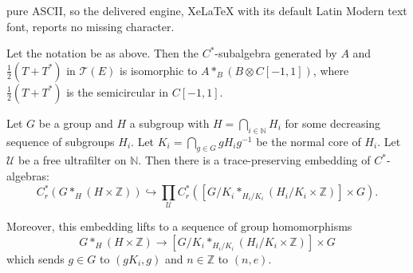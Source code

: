 \documentclass[10pt,a4paper]{amsart}
\newcommand{\N}{\ensuremath{\mathbb{N}}}
\newcommand{\Z}{\ensuremath{\mathbb{Z}}}
\newcommand{\cT}{\ensuremath{\mathcal{T}}}
\newcommand{\cU}{\ensuremath{\mathcal{U}}}
\begin{document}
pure ASCII, so the delivered engine, XeLaTeX with its default Latin Modern text font, reports no missing character.
\begin{thm}\label{isomorphism thm}
    Let the notation be as above. Then the $C^*$-subalgebra generated by $A$ and $\frac{1}{2}(T+T^*)$ in $\cT(E)$ is isomorphic to $A\ast_{B} (B\otimes C[-1,1])$, where $\frac{1}{2}(T+T^*)$ is the semicircular in $C[-1,1]$.
\end{thm}

\begin{lem}\label{lem:2.3}
    Let $G$ be a group and $H$ a subgroup with $H=\bigcap_{i\in \N} H_i$ for some decreasing sequence of subgroups $H_i$. Let $K_i = \bigcap_{g \in G} gH_ig^{-1}$ be the normal core of $H_i$. Let $\cU$ be a free ultrafilter on $\N$. Then there is a trace-preserving embedding of $C^*$-algebras:
    \[C_r^*(G\ast_H (H\times\Z)) \hookrightarrow \prod_\cU C_r^*([G/K_i\ast_{H_i/K_i} (H_i/K_i\times\Z)] \times G).\]

    Moreover, this embedding lifts to a sequence of group homomorphisms
    \[G \ast_H (H \times \Z) \to [G/K_i\ast_{H_i/K_i} (H_i/K_i\times\Z)] \times G\] which sends $g\in G$ to $(gK_i, g)$ and $n\in \Z$ to $(n,e)$. 

\end{lem}
\end{document}
